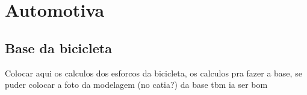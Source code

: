 \chapter[Automotiva]{Automotiva}
\label{automotiva}


\section{Base da bicicleta}
Colocar aqui os calculos dos esforcos da bicicleta, os calculos pra fazer a base, se puder colocar a foto da modelagem (no catia?) da base tbm ia ser bom